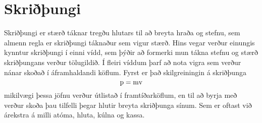 \section{Skriðþungi}
Skriðþungi er stærð táknar tregðu hlutars til að breyta hraða og stefnu, sem
almenn regla er skriðþungi táknaður sem vigur stærð. Hins vegar verður einungis
kynntur skriðþungi í einni vídd, sem þýðir að formerki mun tákna stefnu og
stærð skriðþungans verður tölugildið. Í fleiri víddum þarf að nota vigra sem
verður nánar skoðað í áframhaldandi köflum. Fyrst er það skilgreiningin á
skriðþunga
\begin{equation}
	\text{p} = \textrm{m} \textrm{v}
\end{equation}
mikilvægi þessa jöfnu verður útlistað í framtíðarköflum, en til að byrja með
verður skoða þau tilfelli þegar hlutir breyta skriðþunga sínum. Sem er oftast
við árekstra á milli atóma, hluta, kúlna og kassa.

